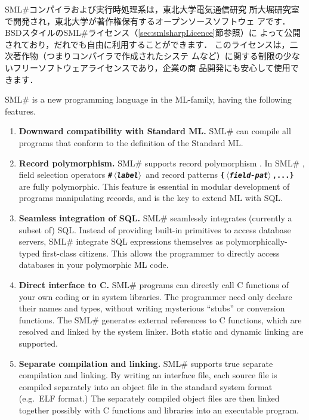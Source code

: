 \documentclass{jbook}
\newcommand{\smlsharp}{SML\#}
\newcommand{\nonterm}[1]{\mbox{$\,\langle$}{\it #1}\mbox{$\rangle\,$}}
\begin{document}
	\smlsharp{}コンパイラおよび実行時処理系は，東北大学電気通信研究
所大堀研究室で開発され，東北大学が著作権保有するオープンソースソフトウェ
アです．
	BSDスタイルの\smlsharp{}ライセンス（\ref{sec:smlsharpLicence}節参照）に
よって公開されており，だれでも自由に利用することができます．
	このライセンスは，二次著作物（つまりコンパイラで作成されたシステ
ムなど）に関する制限の少ないフリーソフトウェアライセンスであり，企業の商
品開発にも安心して使用できます．

\else%

	\smlsharp{} is a new programming language in the ML-family,
having the following features.
\begin{enumerate}
\item {\bf Downward compatibility with Standard ML.}
	\smlsharp{} can compile all programs that conform to the
definition of the Standard ML\cite{sml}.

\item {\bf Record polymorphism.}
	\smlsharp{} supports record polymorphism \cite{ohor95toplas}.
	In \smlsharp{} , field selection operators {\bf\tt \#\nonterm{label}}
and record patterns {\bf\tt \{\nonterm{field-pat},...\}} are fully
polymorphic.
	This feature is essential in modular development of programs
manipulating records, and is the key to extend ML with SQL.

\item {\bf Seamless integration of SQL.}
	\smlsharp{} seamlessly integrates (currently a subset of) SQL.
	Instead of providing built-in primitives to access
database servers, \smlsharp{} integrate SQL expressions themselves as
polymorphically-typed first-class citizens.
	This allows the programmer to directly access databases in
your polymorphic ML code.

\item {\bf Direct interface to C.}
	\smlsharp{} programs can directly call C functions of your own
coding or in system libraries.
	The programmer need only declare their names and types, without
writing mysterious ``stubs'' or conversion functions. 
	The \smlsharp{} generates external references to C functions,
which are resolved and linked by the system linker.
	Both static and dynamic linking are supported.

\item {\bf Separate compilation and linking.}
	\smlsharp{} supports true separate compilation and linking.
	By writing an interface file, each source file is compiled
separately into an object file in the standard system format (e.g.\ ELF
format.)
	The separately compiled object files are then linked together
possibly with C functions and libraries into an executable program.


\end{enumerate}
\end{document}

